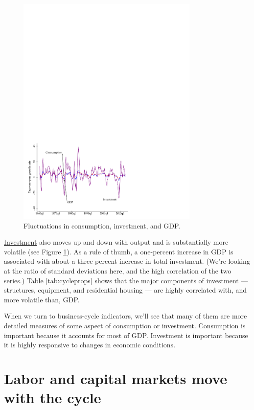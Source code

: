 \begin{figure}[h!]
    \caption{Fluctuations in consumption, investment, and GDP.}
    \label{fig:gcall}%
    \centering
    \includegraphics[width=0.8\textwidth]{Figures/us_inv_cons_gdp.pdf}
\end{figure}

\href{http://research.stlouisfed.org/fred2/series/GPDIC96?cid=112}{Investment}
also moves up and down with output
and is substantially more volatile (see Figure \ref{fig:gcall}).
As a rule of thumb, a one-percent increase in GDP is associated with
about a three-percent increase in total investment.
(We're looking at the ratio of standard deviations here,
and the high correlation of the two series.)
Table \ref{tab:cycleprops}
shows that the major components of investment --- structures, equipment,
and residential housing --- are highly correlated with,
and more volatile than, GDP.


When we turn to 
business-cycle indicators, we'll see that
many of them are more detailed measures of
some aspect of consumption or investment.
Consumption is important because it accounts for most of GDP.
Investment is important because it is highly responsive
to changes in economic conditions.


\section{Labor and capital markets move with the cycle}

